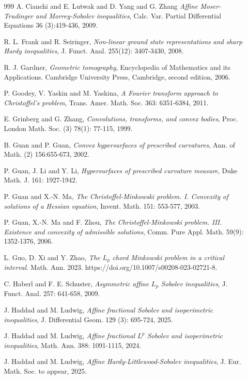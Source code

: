 \documentclass[12pt, oneside,reqno]{amsart}
\numberwithin{equation}{section}
\newtheorem{definition and theorem}[theorem]{Definition and Theorem}
\theoremstyle{plain}
\theoremstyle{remark}
\theoremstyle{definition}
\begin{document}
\begin{thebibliography}{999}
A. Cianchi and E. Lutwak and D. Yang and G. Zhang
\emph{Affine {M}oser-{T}rudinger and {M}orrey-{S}obolev inequalities},
Calc. Var. Partial Differential Equations 36 (3):419-436, 2009. 

R. L. Frank and R. Seiringer,
\emph{Non-linear ground state representations and sharp Hardy inequalities},
J. Funct. Anal. 255(12): 3407-3430, 2008.

R. J. Gardner,
\emph{Geometric tomography},
Encyclopedia of Mathematics and its Applications. Cambridge University Press, Cambridge, second edition, 2006.

P. Goodey, V. Yaskin and M. Yaskina,
\emph{A Fourier transform approach to Christoffel's problem},
Trans. Amer. Math. Soc. 363: 6351-6384, 2011.

E. Grinberg and G. Zhang,
\emph{Convolutions, transforms, and convex bodies},
Proc. London Math. Soc. (3) 78(1): 77-115, 1999.

B. Guan and P. Guan,
\emph{Convex hypersurfaces of prescribed curvatures},
Ann. of Math. (2) 156:655-673, 2002.

P. Guan, J. Li and Y. Li,
\emph{Hypersurfaces of prescribed curvature measure},
Duke Math. J. 161: 1927-1942.

P. Guan and X.-N. Ma,
\emph{The Christoffel-Minkowski problem. I. Convexity of solutions of a Hessian equation},
Invent. Math. 151: 553-577, 2003.

P. Guan, X.-N. Ma and F. Zhou,
\emph{The Christoffel-Minkowski problem. III. Existence and convexity of admissible solutions},
Comm. Pure Appl. Math. 59(9): 1352-1376, 2006.

L. Guo, D. Xi and Y. Zhao,
\emph{The $L_p$ chord Minkowski problem in a critical interval}.
Math. Ann. 2023. https://doi.org/10.1007/s00208-023-02721-8.

C. Haberl and F. E. Schuster,
\emph{Asymmetric affine $L_p$ Sobolev inequalities},
J. Funct. Anal. 257: 641-658, 2009.

J. Haddad and M. Ludwig,
\emph{Affine fractional Sobolev and isoperimetric inequalities}, 
J. Differential Geom. 129 (3): 695-724, 2025.

J. Haddad and M. Ludwig,
\emph{Affine fractional $L^p$ Sobolev and isoperimetric inequalities},
Math. Ann. 388: 1091-1115, 2024.

J. Haddad and M. Ludwig,
\emph{Affine Hardy-Littlewood-Sobolev inequalities},
J. Eur. Math. Soc. to appear, 2025.


\end{thebibliography}
\end{document}
